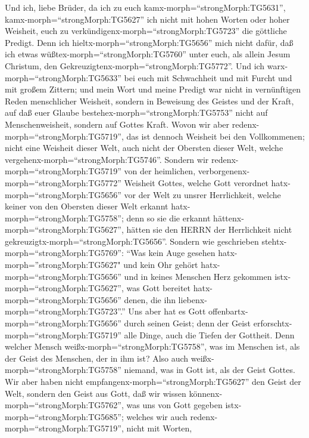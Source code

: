  Und ich, liebe Brüder, da ich zu euch
kamx-morph=``strongMorph:TG5631'', kamx-morph=``strongMorph:TG5627'' ich
nicht mit hohen Worten oder hoher Weisheit, euch zu
verkündigenx-morph=``strongMorph:TG5723'' die göttliche Predigt.
 Denn ich hieltx-morph=``strongMorph:TG5656'' mich nicht
dafür, daß ich etwas wüßtex-morph=``strongMorph:TG5760'' unter euch, als
allein Jesum Christum, den Gekreuzigtenx-morph=``strongMorph:TG5772''.
 Und ich warx-morph=``strongMorph:TG5633'' bei euch mit
Schwachheit und mit Furcht und mit großem Zittern;  und mein
Wort und meine Predigt war nicht in vernünftigen Reden menschlicher
Weisheit, sondern in Beweisung des Geistes und der Kraft, 
auf daß euer Glaube bestehex-morph=``strongMorph:TG5753'' nicht auf
Menschenweisheit, sondern auf Gottes Kraft.  Wovon wir aber
redenx-morph=``strongMorph:TG5719'', das ist dennoch Weisheit bei den
Vollkommenen; nicht eine Weisheit dieser Welt, auch nicht der Obersten
dieser Welt, welche vergehenx-morph=``strongMorph:TG5746''. 
Sondern wir redenx-morph=``strongMorph:TG5719'' von der heimlichen,
verborgenenx-morph=``strongMorph:TG5772'' Weisheit Gottes, welche Gott
verordnet hatx-morph=``strongMorph:TG5656'' vor der Welt zu unsrer
Herrlichkeit,  welche keiner von den Obersten dieser Welt
erkannt hatx-morph=``strongMorph:TG5758''; denn so sie die erkannt
hättenx-morph=``strongMorph:TG5627'', hätten sie den HERRN der
Herrlichkeit nicht gekreuzigtx-morph=``strongMorph:TG5656''.
 Sondern wie geschrieben
stehtx-morph=``strongMorph:TG5769'': ``Was kein Auge gesehen
hatx-morph=''strongMorph:TG5627" und kein Ohr gehört
hatx-morph=``strongMorph:TG5656'' und in keines Menschen Herz gekommen
istx-morph=``strongMorph:TG5627'', was Gott bereitet
hatx-morph=``strongMorph:TG5656'' denen, die ihn
liebenx-morph=``strongMorph:TG5723''.''  Uns aber hat es
Gott offenbartx-morph=``strongMorph:TG5656'' durch seinen Geist; denn
der Geist erforschtx-morph=``strongMorph:TG5719'' alle Dinge, auch die
Tiefen der Gottheit.  Denn welcher Mensch
weißx-morph=``strongMorph:TG5758'', was im Menschen ist, als der Geist
des Menschen, der in ihm ist? Also auch
weißx-morph=``strongMorph:TG5758'' niemand, was in Gott ist, als der
Geist Gottes.  Wir aber haben nicht
empfangenx-morph=``strongMorph:TG5627'' den Geist der Welt, sondern den
Geist aus Gott, daß wir wissen könnenx-morph=``strongMorph:TG5762'', was
uns von Gott gegeben istx-morph=``strongMorph:TG5685''; 
welches wir auch redenx-morph=``strongMorph:TG5719'', nicht mit Worten,
